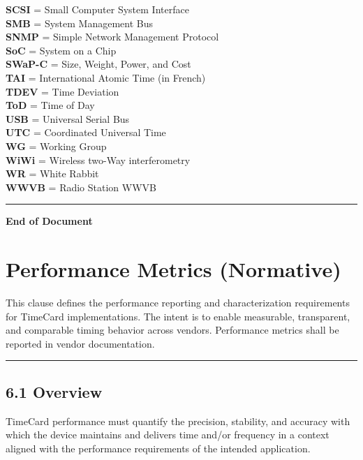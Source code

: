 \textbf{SCSI} = Small Computer System Interface\\
\textbf{SMB} = System Management Bus\\
\textbf{SNMP} = Simple Network Management Protocol\\
\textbf{SoC} = System on a Chip\\
\textbf{SWaP-C} = Size, Weight, Power, and Cost\\
\textbf{TAI} = International Atomic Time (in French)\\
\textbf{TDEV} = Time Deviation\\
\textbf{ToD} = Time of Day\\
\textbf{USB} = Universal Serial Bus\\
\textbf{UTC} = Coordinated Universal Time\\
\textbf{WG} = Working Group\\
\textbf{WiWi} = Wireless two-Way interferometry\\
\textbf{WR} = White Rabbit\\
\textbf{WWVB} = Radio Station WWVB

\begin{center}\rule{0.5\linewidth}{0.5pt}\end{center}

\textbf{End of Document}

\section{Performance Metrics
(Normative)}\label{performance-metrics-normative}

This clause defines the performance reporting and characterization
requirements for TimeCard implementations. The intent is to enable
measurable, transparent, and comparable timing behavior across vendors.
Performance metrics shall be reported in vendor documentation.

\begin{center}\rule{0.5\linewidth}{0.5pt}\end{center}

\subsection{6.1 Overview}\label{overview}

TimeCard performance must quantify the precision, stability, and
accuracy with which the device maintains and delivers time and/or
frequency in a context aligned with the performance requirements of the
intended application.


